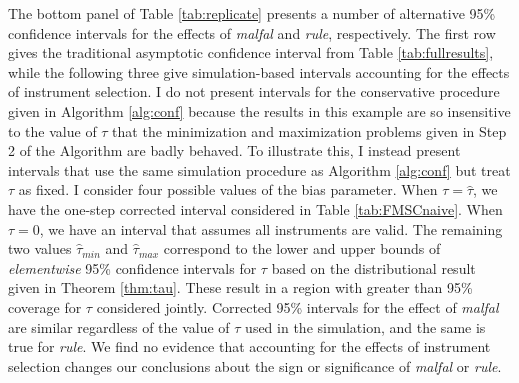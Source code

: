 \documentclass[12pt]{article}
\theoremstyle{definition}
\begin{document}
The bottom panel of Table \ref{tab:replicate} presents a number of alternative 95\% confidence intervals for the effects of \emph{malfal} and \emph{rule}, respectively. The first row gives the traditional asymptotic confidence interval from Table \ref{tab:fullresults}, while the following three give simulation-based intervals accounting for the effects of instrument selection. I do not present intervals for the conservative procedure given in Algorithm \ref{alg:conf} because the results in this example are so insensitive to the value of $\tau$ that the minimization and maximization problems given in Step 2 of the Algorithm are badly behaved. To illustrate this, I instead present intervals that use the same simulation procedure as Algorithm \ref{alg:conf} but treat $\tau$ as fixed. I consider four possible values of the bias parameter. When $\tau = \widehat{\tau}$, we have the one-step corrected interval considered in Table \ref{tab:FMSCnaive}. When $\tau = 0$, we have an interval that assumes all instruments are valid. The remaining two values $\widehat{\tau}_{min}$ and $\widehat{\tau}_{max}$ correspond to the lower and upper bounds of \emph{elementwise} 95\% confidence intervals for $\tau$ based on the distributional result given in Theorem \ref{thm:tau}. These result in a region with greater than 95\% coverage for $\tau$ considered jointly. Corrected 95\% intervals for the effect of \emph{malfal} are similar regardless of the value of $\tau$ used in the simulation, and the same is true for \emph{rule}. We find no evidence that accounting for the effects of instrument selection changes our conclusions about the sign or significance of \emph{malfal} or \emph{rule}.
\end{document}
